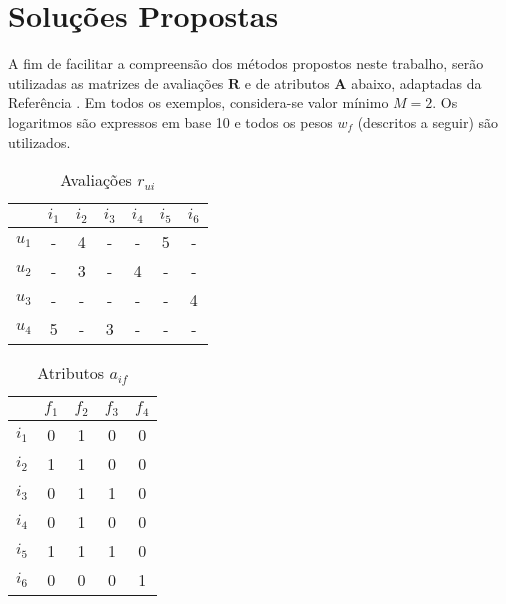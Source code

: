 \chapter[Soluções Propostas]{Soluções Propostas}
\label{chap:sintese_de_solucoes}

A fim de facilitar a compreensão dos métodos propostos neste trabalho, serão utilizadas as matrizes de avaliações $\mathbf{R}$ e de atributos $\mathbf{A}$ abaixo, adaptadas da Referência . Em todos os exemplos, considera-se valor mínimo $M=2$. Os logaritmos são expressos em base 10 e todos os pesos $w_f$ (descritos a seguir) são utilizados.

\begin{table}[h]
\begin{center}
    \caption{Avaliações $r_{ui}$}
    \label{tab:rui_ref}
    \begin{tabular}{ | c | c | c | c | c | c | c | } 
    \hline
     & $i_1$ & $i_2$ & $i_3$ & $i_4$ & $i_5$ & $i_6$ \\ \hline
     $u_1$ & - & 4 & - & - & 5 & - \\ \hline
     $u_2$ & - & 3 & - & 4 & - & - \\ \hline
     $u_3$ & - & - & - & - & - & 4 \\ \hline
     $u_4$ & 5 & - & 3 & - & - & - \\ \hline
    \end{tabular}
\end{center}
\end{table}

\begin{table}[h]
\begin{center}
    \caption{Atributos $a_{if}$}
    \label{tab:aif_ref}
    \begin{tabular}{ | c | c | c | c | c | } 
    \hline
     & $f_1$ & $f_2$ & $f_3$ & $f_4$  \\ \hline
     $i_1$ & 0 & 1 & 0 & 0  \\ \hline
     $i_2$ & 1 & 1 & 0 & 0  \\ \hline
     $i_3$ & 0 & 1 & 1 & 0  \\ \hline
     $i_4$ & 0 & 1 & 0 & 0  \\ \hline
     $i_5$ & 1 & 1 & 1 & 0  \\ \hline
     $i_6$ & 0 & 0 & 0 & 1  \\ \hline
    \end{tabular}
\end{center}
\end{table}

